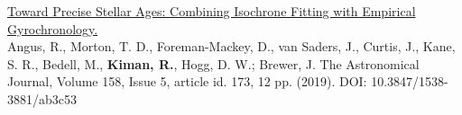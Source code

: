 \documentclass[10pt]{cv}
\begin{document}
\begin{llist}
\begin{etaremune}
  \item \href{https://ui.adsabs.harvard.edu/abs/2019AJ....158..173A/abstract}{Toward Precise Stellar Ages: Combining Isochrone Fitting with Empirical Gyrochronology.}\\  Angus, R., Morton, T. D., Foreman-Mackey, D., van Saders, J., Curtis, J., Kane, S. R., Bedell, M., \textbf{Kiman, R.}, Hogg, D. W.; Brewer, J. The Astronomical Journal, Volume 158, Issue 5, article id. 173, 12 pp. (2019). DOI: 10.3847/1538-3881/ab3c53
\end{etaremune}


\end{llist}
\end{document}
